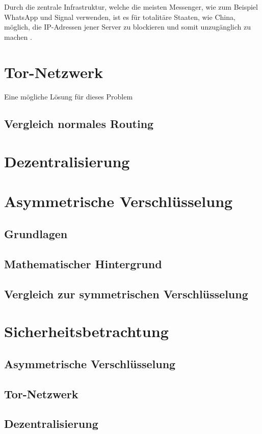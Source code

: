 \documentclass[a4paper,ngerman, headheight=28pt,12pt]{scrartcl}
\newcommand{\vcite}[1]{\cite[vgl.][]{#1}}
\begin{document}
Durch die zentrale Infrastruktur, welche die meisten Messenger, wie zum Beispiel WhatsApp und Signal verwenden, ist es für totalitäre Staaten, wie China, möglich, die IP-Adressen jener Server zu blockieren und somit unzugänglich zu machen \vcite{ChinaFirewall}.


\section{Tor-Netzwerk}
Eine mögliche Lösung für dieses Problem
\subsection{Vergleich normales Routing}

\section{Dezentralisierung}

\section{Asymmetrische Verschlüsselung}
\subsection{Grundlagen}
\subsection{Mathematischer Hintergrund}
\subsection{Vergleich zur symmetrischen Verschlüsselung}


\section{Sicherheitsbetrachtung}
\subsection{Asymmetrische Verschlüsselung}
\subsection{Tor-Netzwerk}
\subsection{Dezentralisierung}
\end{document}
